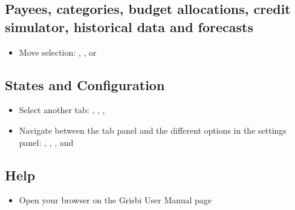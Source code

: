 \subsection{Payees, categories, budget allocations, credit simulator, historical data and forecasts}

\begin{itemize}
	\item Move selection: , ,  or 
\end{itemize}


\subsection{States and Configuration}

\begin{itemize}
	\item Select another tab: , , , 
	\item Navigate between the tab panel and the different options in the settings panel: , , ,  and 
\end{itemize}

\subsection{Help}

\begin{itemize}
	\item Open your browser on the Grisbi User Manual page 
\end{itemize}













